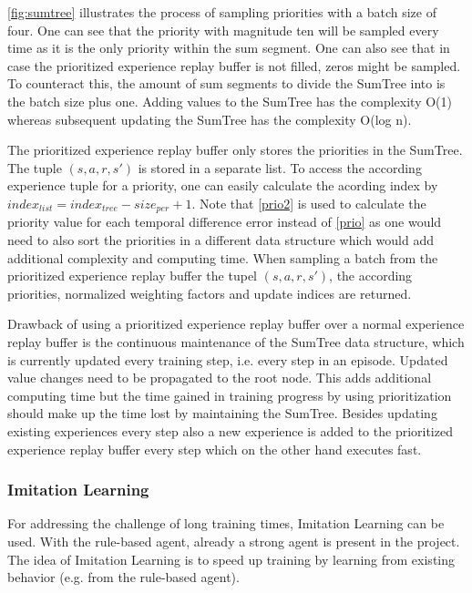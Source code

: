 \autoref{fig:sumtree} illustrates the process of sampling priorities with a batch size of four. One can see that the priority with magnitude ten will be sampled every time as it is the only priority within the sum segment. One can also see that in case the prioritized experience replay buffer is not filled, zeros might be sampled. To counteract this, the amount of sum segments to divide the SumTree into is the batch size plus one. Adding values to the SumTree has the complexity O(1) whereas subsequent updating the SumTree has the complexity O(log n). 

The prioritized experience replay buffer only stores the priorities in the SumTree. The tuple $(s,a,r,s')$ is stored in a separate list. To access the according experience tuple for a priority, one can easily calculate the acording index by $index_{list} = index_{tree} - size_{per} + 1$. Note that \autoref{prio2} is used to calculate the priority value for each temporal difference error instead of \autoref{prio} as one would need to also sort the priorities in a different data structure which would add additional complexity and computing time. When sampling a batch from the prioritized experience replay buffer the tupel $(s,a,r,s')$, the according priorities, normalized weighting factors and update indices are returned. 

Drawback of using a prioritized experience replay buffer over a normal experience replay buffer is the continuous maintenance of the SumTree data structure, which is currently updated every training step, i.e. every step in an episode. Updated value changes need to be propagated to the root node. This adds additional computing time but the time gained in training progress by using prioritization should make up the time lost by maintaining the SumTree. Besides updating existing experiences every step also a new experience is added to the prioritized experience replay buffer every step which on the other hand executes fast. 

\subsubsection{Imitation Learning}
\label{ch:approachBc}

For addressing the challenge of long training times, Imitation Learning can be used. With the rule-based agent, already a strong agent is present in the project. The idea of Imitation Learning is to speed up training by learning from existing behavior (e.g. from the rule-based agent).

